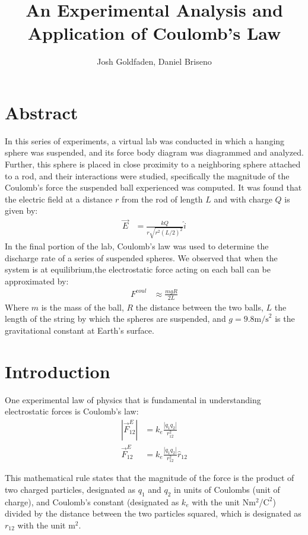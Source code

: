 \documentclass[oneside,12pt]{amsart}
\title{An Experimental Analysis and Application of Coulomb’s Law}
\author{Josh Goldfaden, Daniel Briseno}
\date{}
\begin{document}
	\maketitle
	\section{Abstract}
	In this series of experiments, a virtual lab was conducted in which a hanging sphere was suspended, and its force body diagram was diagrammed and analyzed. Further, this sphere is placed in close proximity to a neighboring sphere attached to a rod, and their interactions were studied, specifically the magnitude of the Coulomb's force the suspended ball experienced was computed. It was found that the electric field at a distance $r$ from the rod of length $L$ and with charge $Q$ is given by:
	\begin{align*}
		\vec{E} &=  \frac{kQ}{r\sqrt{r^2(L/2)^2}}\hat{i}
	\end{align*}
	In the final portion of the lab, Coulomb’s law was used to determine the discharge rate of a series of suspended spheres. We observed that when the system is at equilibrium,the electrostatic force acting on each ball can be approximated by: 
	\begin{align*}
	F^{coul} &\approx \frac{mgR}{2L}
	\end{align*}
	Where $m$ is the mass of the ball, $R$ the distance between the two balls, $L$ the length of the string by which the spheres are suspended, and $g= 9.8\text{m/s}^2$ is the gravitational constant at Earth's surface.
	\section{Introduction}
	One experimental law of physics that is fundamental in understanding electrostatic forces is Coulomb’s law\cite{mazur_pedigo_crouch_dourmashkin_bieniek_banfi_jisrawi_setlur_2016}: 
	\begin{align}
		|\vec{F}^E_{12}| &= k_e \frac{|q_1 q_2|}{r_{12}^2}\\
		\vec{F}^E_{12} &= k_e \frac{|q_1 q_2|}{r_{12}^2} \hat{r}_{12} 
	\end{align}
	
	\indent This mathematical rule states that the magnitude of the force is the product of two charged particles, designated as $q_1$ and $q_2$ in units of Coulombs (unit of charge), and Coulomb’s constant (designated as $k_e$ with the unit N$\text{m}^2$/$\text{C}^2$) divided by the distance between the two particles squared, which is designated as $r_{12}$ with the unit $\text{m}^2$. \\ 
	
\end{document}
